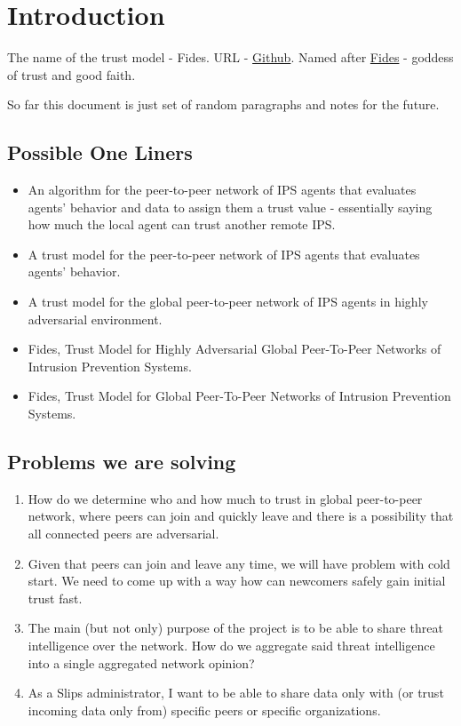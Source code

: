 \chapter{Introduction}

The name of the trust model - Fides. URL - \href{https://github.com/LukasForst/fides}{Github}.
Named after \href{https://en.wikipedia.org/wiki/Fides_(deity)}{Fides} - goddess of trust and good faith.

So far this document is just set of random paragraphs and notes for the future.

\section{Possible One Liners}
\begin{itemize}
\item An algorithm for the peer-to-peer network of IPS agents that evaluates agents’ behavior and data to assign them a trust value - essentially saying how much the local agent can trust another remote IPS.
\item A trust model for the peer-to-peer network of IPS agents that evaluates agents’ behavior.
\item A trust model for the global peer-to-peer network of IPS agents in highly adversarial environment.
\item Fides, Trust Model for Highly Adversarial Global Peer-To-Peer Networks of Intrusion Prevention Systems.
\item Fides, Trust Model for Global Peer-To-Peer Networks of Intrusion Prevention Systems.
\end{itemize}

\section{Problems we are solving}
\begin{enumerate}
\item How do we determine who and how much to trust in global peer-to-peer network, where peers can join and quickly leave and there is a possibility that all connected peers are adversarial.
\item Given that peers can join and leave any time, we will have problem with cold start. We need to come up with a way how can newcomers safely gain initial trust fast.
\item The main (but not only) purpose of the project is to be able to share threat intelligence over the network. How do we aggregate said threat intelligence into a single aggregated network opinion?
\item As a Slips administrator, I want to be able to share data only with (or trust incoming data only from) specific peers or specific organizations.
\end{enumerate}